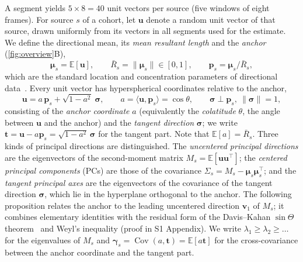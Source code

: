 \documentclass[10pt,letterpaper]{article}
\newcommand{\E}{\mathbb{E}}
\newcommand{\Rbar}{\bar{R}}
\newcommand{\anchor}{\bm{p}}
\newcommand{\uvec}{\bm{u}}
\newcommand{\tvec}{\bm{t}}
\begin{document}
A segment yields $5\times8=40$ unit vectors per source (five windows of eight frames).
For source $s$ of a cohort, let $\uvec$ denote a random unit vector of that source,
drawn uniformly from its vectors in all segments used for the estimate. We define the
directional mean, its \emph{mean resultant length} and the \emph{anchor}
(\cref{fig:overview}B),
\begin{equation}
  \bm{\mu}_s=\E[\uvec],\qquad \Rbar_s=\lVert\bm{\mu}_s\rVert\in[0,1],\qquad
  \anchor_s=\bm{\mu}_s/\Rbar_s ,
\end{equation}
which are the standard location and concentration parameters of directional data~\cite{mardia2000directional}. Every unit vector has hyperspherical coordinates relative
to the anchor,
\begin{equation}\label{eq:coords}
  \uvec=a\,\anchor_s+\sqrt{1-a^{2}}\;\bm{\sigma},\qquad
  a=\langle\uvec,\anchor_s\rangle=\cos\theta,\qquad
  \bm{\sigma}\perp\anchor_s,\ \lVert\bm{\sigma}\rVert=1 ,
\end{equation}
consisting of the \emph{anchor coordinate} $a$ (equivalently the \emph{colatitude}
$\theta$, the angle between $\uvec$ and the anchor) and the \emph{tangent direction}
$\bm{\sigma}$; we write $\tvec=\uvec-a\anchor_s=\sqrt{1-a^{2}}\,\bm{\sigma}$ for the
tangent part. Note that $\E[a]=\Rbar_s$. Three kinds of principal directions are
distinguished. The \emph{uncentered principal directions} are the eigenvectors of the
second-moment matrix $M_s=\E[\uvec\uvec^{\top}]$; the \emph{centered principal
components} (PCs) are those of the covariance $\Sigma_s=M_s-\bm{\mu}_s\bm{\mu}_s^{\top}$;
and the \emph{tangent principal axes} are the eigenvectors of the covariance of the
tangent direction $\bm{\sigma}$, which lie in the hyperplane orthogonal to the anchor.
The following proposition relates the anchor to the leading uncentered direction
$\bm{v}_1$ of $M_s$; it combines elementary identities with the residual form of the Davis--Kahan
$\sin\Theta$ theorem~\cite{davis1970rotation} and Weyl's inequality (proof in S1 Appendix). We write $\lambda_1\geq\lambda_2\geq\dots$
for the eigenvalues of $M_s$ and $\bm{\gamma}_s=\operatorname{Cov}(a,\tvec)=\E[a\tvec]$ for the
cross-covariance between the anchor coordinate and the tangent part.
\end{document}

